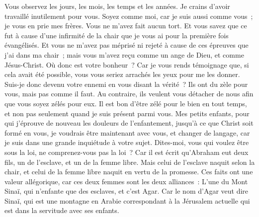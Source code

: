 \begin{multicols}{2}
Vous observez les jours, les mois, les temps et les années.
Je crains d'avoir travaillé inutilement pour vous.
Soyez comme moi, car je suis aussi comme vous~; je vous en prie mes frères.
Vous ne m'avez fait aucun tort. Et vous savez que ce fut à cause d'une infirmité de la chair que je vous ai pour la première fois évangélisés.
Et vous ne m'avez pas méprisé ni rejeté à cause de ces épreuves que j'ai dans ma chair~; mais vous m'avez reçu comme un ange de Dieu, et comme Jésus-Christ.
Où donc est votre bonheur~? Car je vous rends témoignage que, si cela avait été possible, vous vous seriez arrachés les yeux pour me les donner.
Suis-je donc devenu votre ennemi en vous disant la vérité~?
Ils ont du zèle pour vous, mais pas comme il faut. Au contraire, ils veulent vous détacher de nous afin que vous soyez zélés pour eux.
Il est bon d'être zélé pour le bien en tout temps, et non pas seulement quand je suis présent parmi vous.
Mes petits enfants, pour qui j'éprouve de nouveau les douleurs de l'enfantement, jusqu'à ce que Christ soit formé en vous,
je voudrais être maintenant avec vous, et changer de langage, car je suis dans une grande inquiétude à votre sujet.
Dites-moi, vous qui voulez être sous la loi, ne comprenez-vous pas la loi~?
Car il est écrit qu'Abraham eut deux fils, un de l'esclave, et un de la femme libre.
Mais celui de l'esclave naquit selon la chair, et celui de la femme libre naquit en vertu de la promesse.
Ces faits ont une valeur allégorique, car ces deux femmes sont les deux alliances~: L'une du Mont Sinaï, qui n'enfante que des esclaves, et c'est Agar.
Car le nom d'Agar veut dire Sinaï, qui est une montagne en Arabie correspondant à la Jérusalem actuelle qui est dans la servitude avec ses enfants.

\end{multicols}
